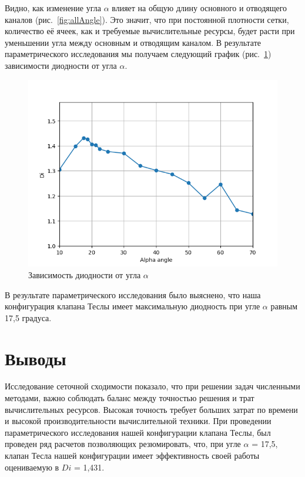 \documentclass[10pt,a4paper]{book}
\begin{document}
    Видно, как изменение угла $\alpha$ влияет на общую длину основного и отводящего каналов (рис.~\ref{fig:allAngle}). Это значит, что при постоянной плотности сетки, количество её ячеек, как и требуемые вычислительные ресурсы, будет расти при уменьшении угла между основным и отводящим каналом. В результате параметрического исследования мы получаем следующий график (рис.~\ref{fig:alphaAngle}) зависимости диодности от угла $ \alpha $.
    
    
    
    
    \begin{figure}[H]
        \centering
        \includegraphics[width = 1\linewidth]{alphaAngle}
        \caption{Зависимость диодности от угла $\alpha$}
        \label{fig:alphaAngle}
    \end{figure}    
    В результате параметрического исследования было выяснено, что наша конфигурация клапана Теслы имеет максимальную диодность при угле $ \alpha $ равным 17,5 градуса. 
    
    \section{Выводы}
    
    Исследование сеточной сходимости показало, что при решении задач численными методами, важно соблюдать баланс между точностью решения и трат вычислительных ресурсов. Высокая точность требует больших затрат по времени и высокой производительности вычислительной техники. При проведении параметрического исследования нашей конфигурации клапана Теслы, был проведен ряд расчетов позволяющих резюмировать, что, при угле $\alpha$  = 17,5\textdegree, клапан Тесла нашей конфигурации имеет эффективность своей работы оцениваемую в $Di$ = 1,431.
    
\end{document}
